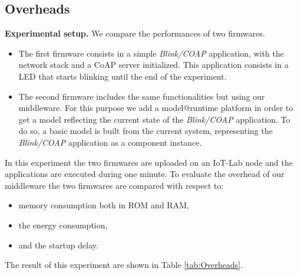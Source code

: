 \subsection{Overheads}
\textbf{Experimental setup.} We compare the performances of two firmwares.
\begin{itemize}
	\item The first firmware consists in a simple \emph{Blink/COAP} application, with the network stack and a CoAP server initialized.
	This application consists in a LED that starts blinking until the end of the experiment.
	\item The second firmware includes the same functionalities but using our middleware. For this purpose we add a model@runtime platform in order to get a model reflecting the current state of the \emph{Blink/COAP} application.
	To do so, a basic model is built from the current system, representing the \emph{Blink/COAP} application as a component instance.
\end{itemize}


In this experiment the two firmwares are uploaded on an IoT-Lab node and the applications are executed during one minute.
To evaluate the overhead of our middleware the two firmwares are compared with respect to:

\begin{itemize}
	\item memory consumption both in ROM and RAM, 
	\item the energy consumption,
	\item and the startup delay.
\end{itemize}

The result of this experiment are shown in Table \ref{tab:Overheads}. 

